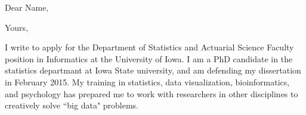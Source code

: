 \documentclass[11pt,letterpaper,sans,unicode]{moderncv}        %
\begin{document}
\date{April 20, 2017}
\opening{Dear Name,}
\closing{Yours,}
\makelettertitle
%

I write to apply for the Department of Statistics and Actuarial Science Faculty position in Informatics at the University of Iowa. I am a PhD candidate in the statistics departmant at Iowa State university, and am defending my dissertation in February 2015. My training in statistics, data visualization, bioinformatics, and psychology has prepared me to work with researchers in other disciplines to creatively solve ``big data" problems.



\end{document}
